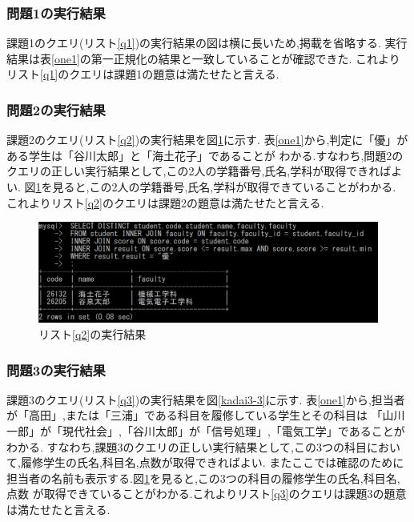 \documentclass[a4j]{jarticle}
\begin{document}
    \subsubsection{問題1の実行結果}
    課題1のクエリ(リスト\ref{q1})の実行結果の図は横に長いため,掲載を省略する.
    実行結果は表\ref{one1}の第一正規化の結果と一致していることが確認できた.
    これよりリスト\ref{q1}のクエリは課題1の題意は満たせたと言える.

    \subsubsection{問題2の実行結果}
    課題2のクエリ(リスト\ref{q2})の実行結果を図\ref{kadai3-2}に示す.
    表\ref{one1}から,判定に「優」がある学生は「谷川太郎」と「海土花子」であることが
    わかる.すなわち,問題2のクエリの正しい実行結果として,この2人の学籍番号,氏名,学科が取得できればよい.
    図\ref{kadai3-2}を見ると,この2人の学籍番号,氏名,学科が取得できていることがわかる.
    これよりリスト\ref{q2}のクエリは課題2の題意は満たせたと言える.

    \begin{figure}[H]
      \centering
      \includegraphics[scale=0.9]{kadai3-2.png}
      \caption{リスト\ref{q2}の実行結果}
       \label{kadai3-2}
      \end{figure}

    \subsubsection{問題3の実行結果}
    課題3のクエリ(リスト\ref{q3})の実行結果を図\ref{kadai3-3}に示す.
    表\ref{one1}から,担当者が「高田」,または「三浦」である科目を履修している学生とその科目は
    「山川一郎」が「現代社会」,「谷川太郎」が「信号処理」,「電気工学」であることがわかる.
    すなわち,課題3のクエリの正しい実行結果として,この3つの科目において,履修学生の氏名,科目名,点数が取得できればよい.
    またここでは確認のために担当者の名前も表示する.図\ref{kadai3-2}を見ると,この3つの科目の履修学生の氏名,科目名,点数
    が取得できていることがわかる.これよりリスト\ref{q3}のクエリは課題3の題意は満たせたと言える.
\end{document}

